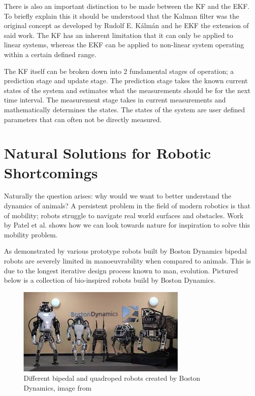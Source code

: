 There is also an important distinction to be made between the KF and the EKF. To briefly explain this it should be understood that the Kalman filter was the original concept as developed by Rudolf E. Kálmán and he EKF the extension of said work. The KF has an inherent limitation that it can only be applied to linear systems, whereas the EKF can be applied to non-linear system operating within a certain defined range.

The KF itself can be broken down into 2 fundamental stages of operation; a prediction stage and update stage. The prediction stage takes the known current states of the system and estimates what the measurements should be for the next time interval. The measurement stage takes in current measurements and mathematically determines the states. The states of the system are user defined parameters that can often not be directly measured.






\section{Natural Solutions for Robotic Shortcomings}
Naturally the question arises:  why would we want to better understand the dynamics of animals? A persistent problem in the field of modern robotics is that of mobility; robots struggle to navigate real world surfaces and obstacles. Work by Patel et al. \cite{patel2013rapid} shows how we can look towards nature for inspiration to solve this mobility problem. 

As demonstrated by various prototype robots built by Boston Dynamics bipedal robots are severely limited in manoeuvrability when compared to animals. This is due to the longest iterative design process known to man, evolution. Pictured below is a collection of bio-inspired robots build by Boston Dynamics.

\begin{figure}[!ht] 
\captionsetup{width=0.75\linewidth, font=small}  
\includegraphics[width=0.75\linewidth]{figures/boston.jpg}
\caption{Different bipedal and quadroped robots created by Boston Dynamics, image from \cite{bostondynamics}}
\label{fig:boston}
\end{figure}  


